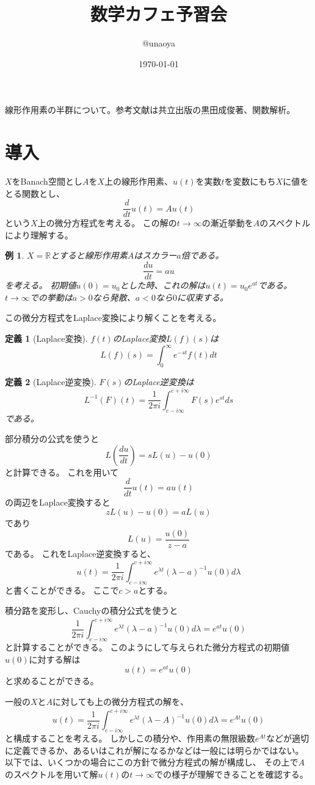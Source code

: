 \documentclass{jsarticle}
\title{数学カフェ予習会}
\author{@unaoya}
\date{\today}
\newtheorem{dfn}{定義}
\newtheorem{eg}{例}
\newcommand{\R}{\mathbb{R}}
\begin{document}
\maketitle
線形作用素の半群について。参考文献は共立出版の黒田成俊著、関数解析。

\section{導入}
$X$をBanach空間とし$A$を$X$上の線形作用素、$u(t)$を実数$t$を変数にもち$X$に値をとる関数とし、
\[
\frac{d}{dt}u(t)=Au(t)
\]
という$X$上の微分方程式を考える。
この解の$t\to \infty$の漸近挙動を$A$のスペクトルにより理解する。

\begin{eg}
$X=\R$とすると線形作用素$A$はスカラー$a$倍である。
\[
\frac{du}{dt}=au
\]
を考える。
初期値$u(0)=u_0$とした時、これの解は$u(t)=u_0e^{at}$である。
$t\to\infty$での挙動は$a>0$なら発散、$a<0$なら$0$に収束する。
\end{eg}

この微分方程式をLaplace変換により解くことを考える。
\begin{dfn}[Laplace変換]
$f(t)$の{\rm Laplace}変換$L(f)(s)$は
\[
L(f)(s)=\int^\infty_0e^{-st}f(t)dt
\]
\end{dfn}

\begin{dfn}[Laplace逆変換]
$F(s)$の{\rm Laplace}逆変換は
\[
L^{-1}(F)(t)=\frac{1}{2\pi i}\int^{c+i\infty}_{c-i\infty}F(s)e^{st}ds
\]
である。
\end{dfn}

部分積分の公式を使うと
\[
L(\frac{du}{dt})=sL(u)-u(0)
\]
と計算できる。
これを用いて
\[
\frac{d}{dt}u(t)=au(t)
\]
の両辺をLaplace変換すると
\[
zL(u) -u(0)=aL(u)
\]
であり
\[
L(u)=\frac{u(0)}{z-a}
\]
である。
これをLaplace逆変換すると、
\[
u(t)=\frac{1}{2\pi i}\int^{c+i\infty}_{c-i\infty}e^{\lambda t}(\lambda-a)^{-1}u(0)d\lambda
\]
と書くことができる。
ここで$c>a$とする。

積分路を変形し、Cauchyの積分公式を使うと
\[
\frac{1}{2\pi i}\int^{c+i\infty}_{c-i\infty}e^{\lambda t}(\lambda-a)^{-1}u(0)d\lambda=e^{at}u(0)
\]
と計算することができる。
このようにして与えられた微分方程式の初期値$u(0)$に対する解は
\[
u(t)=e^{at}u(0)
\]
と求めることができる。

一般の$X$と$A$に対しても上の微分方程式の解を、
\[
u(t)=\frac{1}{2\pi i}\int^{c+i\infty}_{c-i\infty}e^{\lambda t}(\lambda-A)^{-1}u(0)d\lambda=e^{At}u(0)
\]
と構成することを考える。
しかしこの積分や、作用素の無限級数$e^{At}$などが適切に定義できるか、あるいはこれが解になるかなどは一般には明らかではない。
以下では、いくつかの場合にこの方針で微分方程式の解が構成し、
その上で$A$のスペクトルを用いて解$u(t)$の$t\to\infty$での様子が理解できることを確認する。
\end{document}
